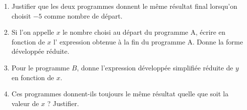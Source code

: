 \documentclass[main.tex]{subfiles}
\begin{document}
\begin{exercise}
\begin{enumerate}[label={\alph*)}, leftmargin=*]
	\textbf{Programme A :} $-2 \rightarrow \hfill  \rightarrow\hfill\rightarrow \hfill\rightarrow \hfill$\\
	\textbf{Programme B :} $-2 \rightarrow \hfill  \rightarrow\hfill\rightarrow \hfill\rightarrow \hfill$
	\item  Justifier que les deux programmes donnent le même résultat final lorsqu’on choisit $-5$ comme	nombre de départ. 
	\item Si l'on appelle \og $x$ \fg{} le nombre choisi au départ du programme A, écrire en
	fonction de $x$ l' expression obtenue à la fin du programme A. Donne la forme développée réduite. 
	\item Pour le programme $B$, donne l'expression développée simplifiée réduite de $y$ en fonction de $x$.
	\item Ces programmes donnent-ils toujours le même résultat quelle que soit la valeur de $x$ ? Justifier. 
\end{enumerate} 
\end{exercise}
\end{document}
